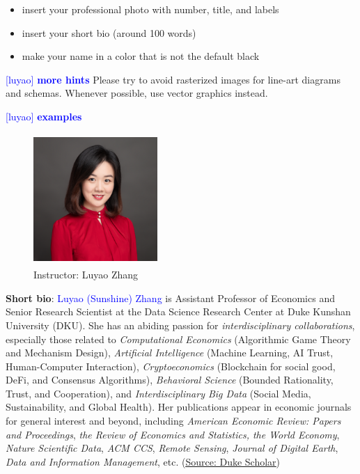 \documentclass[runningheads]{llncs}
\newcommand{\luyao}[1]{\textcolor{blue}{[luyao] #1}}
\newcommand{\luyao}[1]{}
\begin{document}
\begin{itemize}
    \item insert your professional photo with number, title, and labels
    \item insert your short bio (around 100 words) 
    \item make your name in a color that is not the default black
\end{itemize}
\luyao{\textbf{more hints}}
Please try to avoid rasterized images for line-art diagrams and
schemas. Whenever possible, use vector graphics instead.
\newpage

\luyao{\textbf{examples}}

\begin{figure}
\centering
\includegraphics[width=4.7cm, height=5cm]{figs/fig1.jpg}
\caption{Instructor: Luyao Zhang} \label{fig:1}
\end{figure}


\noindent \textbf{Short bio}: \textcolor{blue}{Luyao (Sunshine) Zhang} is Assistant Professor of Economics and Senior Research Scientist at the Data Science Research Center at Duke Kunshan University (DKU). She has an abiding passion for \textit{interdisciplinary collaborations}, especially those related to \textit{Computational Economics} (Algorithmic Game Theory and Mechanism Design), \textit{Artificial Intelligence} (Machine Learning, AI Trust, Human-Computer Interaction), \textit{Cryptoeconomics} (Blockchain for social good, DeFi, and Consensus Algorithms), \textit{Behavioral Science} (Bounded Rationality, Trust, and Cooperation), and \textit{Interdisciplinary Big Data} (Social Media, Sustainability, and Global Health). Her publications appear in economic journals for general interest and beyond, including \emph{American Economic Review: Papers and Proceedings}, \emph{the Review of Economics and Statistics, the World Economy}, \textit{Nature Scientific Data}, \emph{ACM CCS},  \textit{Remote Sensing}, \emph{Journal of Digital Earth}, \textit{Data and Information Management}, etc. (\href{https://scholars.duke.edu/person/luyao.zhang}{\underline{Source: Duke Scholar}})
\end{document}
